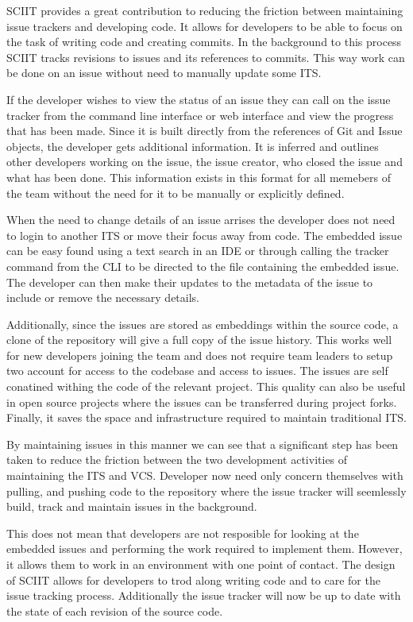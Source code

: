 \documentclass{mproj}
\begin{document}
SCIIT provides a great contribution to reducing the friction between maintaining issue trackers and developing code. It allows for developers to be able to focus on the task of writing code and creating commits. In the background to this process SCIIT tracks revisions to issues and its references to commits. This way work can be done on an issue without need to manually update some ITS.

If the developer wishes to view the status of an issue they can call on the issue tracker from the command line interface or web interface and view the progress that has been made. Since it is built directly from the references of Git and Issue objects, the developer gets additional information. It is inferred and outlines other developers working on the issue, the issue creator, who closed the issue and what has been done. This information exists in this format for all memebers of the team without the need for it to be manually or explicitly defined.

When the need to change details of an issue arrises the developer does not need to login to another ITS or move their focus away from code. The embedded issue can be easy found using a text search in an IDE or through calling the tracker command from the CLI to be directed to the file containing the embedded issue. The developer can then make their updates to the metadata of the issue to include or remove the necessary details.

Additionally, since the issues are stored as embeddings within the source code, a clone of the repository will give a full copy of the issue history. This works well for new developers joining the team and does not require team leaders to setup two account for access to the codebase and access to issues. The issues are self conatined withing the code of the relevant project. This quality can also be useful in open source projects where the issues can be transferred during project forks. Finally, it saves the space and infrastructure required to maintain traditional ITS. 

By maintaining issues in this manner we can see that a significant step has been taken to reduce the friction between the two development activities of maintaining the ITS and VCS. Developer now need only concern themselves with pulling, and pushing code to the repository where the issue tracker will seemlessly build, track and maintain issues in the background.

This does not mean that developers are not resposible for looking at the embedded issues and performing the work required to implement them. However, it allows them to work in an environment with one point of contact. The design of SCIIT allows for developers to trod along writing code and to care for the issue tracking process. Additionally the issue tracker will now be up to date with the state of each revision of the source code.
\end{document}
